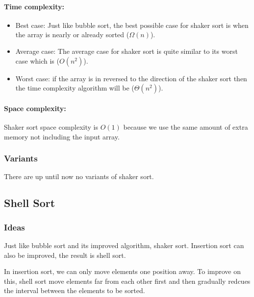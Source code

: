 \documentclass{article}
\newcommand\tab[1][0.5cm]{\hspace*{#1}}
\begin{document}
\paragraph{\tab Time complexity:}

\begin{itemize}
    \item Best case: Just like bubble sort, the best possible case for shaker sort is when the array is nearly or already sorted ($\Omega(n)$).

    \item Average case: The average case for shaker sort is quite similar to its worst case which is ($O(n^2)$).
    
    \item Worst case: if the array is in reversed to the direction of the shaker sort then the time complexity algorithm will be ($\Theta(n^2)$).
\end{itemize}

\paragraph{\tab Space complexity:}

Shaker sort space complexity is $O(1)$ because we use the same amount of extra memory not including the input array.

\subsubsection{Variants}

There are up until now no variants of shaker sort.

\pagebreak

\subsection{Shell Sort}

\subsubsection{Ideas}
\tab Just like bubble sort and its improved algorithm, shaker sort. Insertion sort can also be improved, the result is shell sort.

In insertion sort, we can only move elements one position away. To improve on this, shell sort move elements far from each other first and then gradually redcues the interval between the elements to be sorted.

\bigskip
\end{document}
